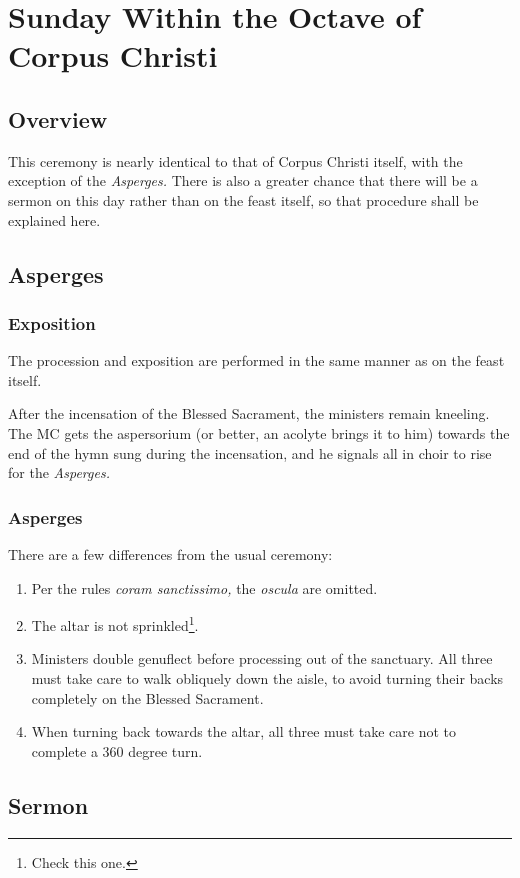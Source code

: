 \documentclass[10pt]{report}
\begin{document}
\chapter{Sunday Within the Octave of Corpus Christi}

\section{Overview}

This ceremony is nearly identical to that of Corpus Christi itself, with the
exception of the \textit{Asperges.} There is also a greater chance that there
will be a sermon on this day rather than on the feast itself, so that procedure
shall be explained here.

\section{Asperges}

\subsection{Exposition}

The procession and exposition are performed in the same manner as on the feast
itself.

After the incensation of the Blessed Sacrament, the ministers remain kneeling.
The MC gets the aspersorium (or better, an acolyte brings it to him) towards the
end of the hymn sung during the incensation, and he signals all in choir to rise
for the \textit{Asperges.}

\subsection{Asperges}

There are a few differences from the usual ceremony:

\begin{enumerate}

    \item Per the rules \textit{coram sanctissimo,} the \textit{oscula} are
        omitted.

    \item The altar is not sprinkled\footnote{Check this one.}.

    \item Ministers double genuflect before processing out of the sanctuary. All
        three must take care to walk obliquely down the aisle, to avoid turning
        their backs completely on the Blessed Sacrament.

    \item When turning back towards the altar, all three must take care not to
        complete a 360 degree turn.

\end{enumerate}

\section{Sermon}
\end{document}
